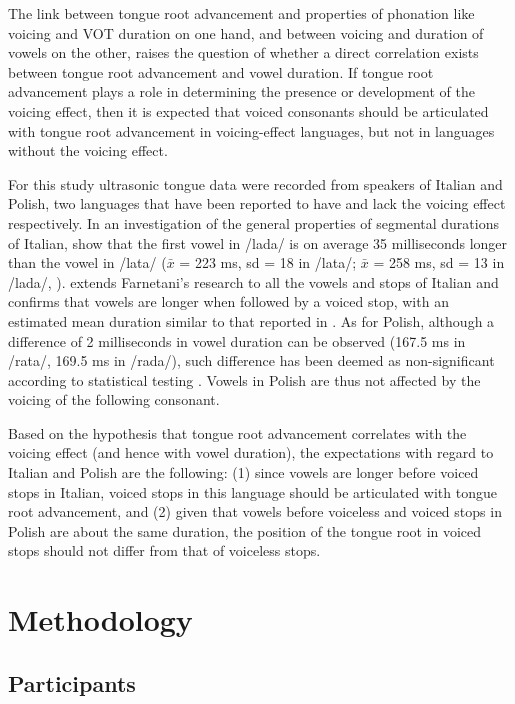 \documentclass[authoryear, 5p]{elsarticle}
\begin{document}
The link between tongue root advancement and properties of phonation
like voicing and VOT duration on one hand, and between voicing and
duration of vowels on the other, raises the question of whether a direct
correlation exists between tongue root advancement and vowel duration.
If tongue root advancement plays a role in determining the presence or
development of the voicing effect, then it is expected that voiced
consonants should be articulated with tongue root advancement in
voicing-effect languages, but not in languages without the voicing
effect.

For this study ultrasonic tongue data were recorded from speakers of
Italian and Polish, two languages that have been reported to have and
lack the voicing effect respectively. In an investigation of the general
properties of segmental durations of Italian, \citet{farnetani1986} show
that the first vowel in /lada/ is on average 35 milliseconds longer than
the vowel in /lata/ (\(\bar{x}\) = 223 ms, sd = 18 in /lata/;
\(\bar{x}\) = 258 ms, sd = 13 in /lada/, \citealt[26]{farnetani1986}).
\citet{esposito2002} extends Farnetani's research to all the vowels and
stops of Italian and confirms that vowels are longer when followed by a
voiced stop, with an estimated mean duration similar to that reported in
\citet{farnetani1986}. As for Polish, although a difference of 2
milliseconds in vowel duration can be observed (167.5 ms in /rata/,
169.5 ms in /rada/), such difference has been deemed as non-significant
according to statistical testing \citep{keating1984}. Vowels in Polish
are thus not affected by the voicing of the following consonant.

Based on the hypothesis that tongue root advancement correlates with the
voicing effect (and hence with vowel duration), the expectations with
regard to Italian and Polish are the following: (1) since vowels are
longer before voiced stops in Italian, voiced stops in this language
should be articulated with tongue root advancement, and (2) given that
vowels before voiceless and voiced stops in Polish are about the same
duration, the position of the tongue root in voiced stops should not
differ from that of voiceless stops.

\section{Methodology}\label{methodology}

\subsection{Participants}\label{participants}
\end{document}
